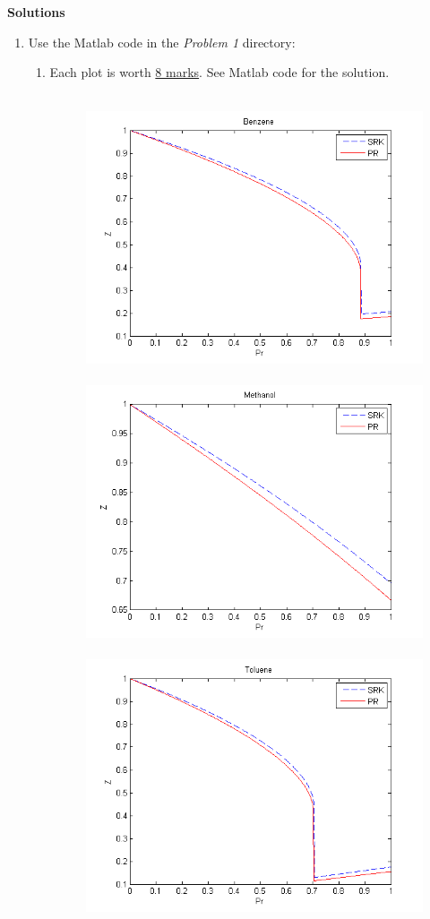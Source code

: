 \documentclass[12pts,a4paper,amsmath,amssymb,floatfix]{article}%
\begin{document}
\clearpage

\begin{center}
  \Large{\bf Solutions}
\end{center}


\begin{enumerate}[label=\bfseries Problem \arabic*:]
   \item Use the Matlab code in the {\it Problem 1} directory:
      \begin{enumerate}[label=\bfseries Task \arabic*:]
        \item Each plot is worth \underline{8 marks}. See Matlab code for the solution.
          \begin{figure}[h]
             \vbox{
                   \hbox{ 
                          \includegraphics[width=8.cm,height=6.cm,clip]{./Figs/Benzene.png}
                          \includegraphics[width=8.cm,height=6.cm,clip]{./Figs/Methanol.png}
                         }
                   \hbox{ 
                          \includegraphics[width=8.cm,height=6.cm,clip]{./Figs/Toluene.png}
}}
\end{figure}
\end{enumerate}
\end{enumerate}
\end{document}
